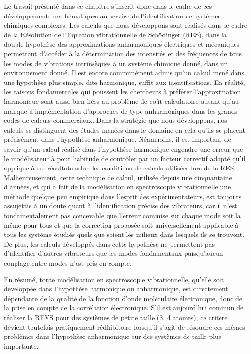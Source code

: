 Le travail présenté dans ce chapitre s'inscrit donc dans le cadre de ces développements mathématiques au service de l'identification de systèmes chimiques complexes. Les calculs que nous développons sont réalisés dans le cadre de la Résolution de l'Equation vibrationnelle de Sch\"{o}dinger (RES), dans la double hypothèse des approximations anharmoniques électriques et mécaniques permettant d'accéder à la détermination des intensités et des fréquences de tous les modes de vibrations intrinsèques à un système chimique donné, dans un environnement donné. Il est encore communément admis qu'un calcul mené dans une hypothèse plus simple, dite harmonique, suffit aux identifications. En réalité, les raisons fondamentales qui poussent les chercheurs à préférer l'approximation harmonique sont aussi bien liées au problème de coût calculatoire autant qu'au manque d'implémentation d'approches de type anharmoniques dans les grands codes de calculs commerciaux. Dans la stratégie que nous développons, nos calculs se distinguent des études menées dans le domaine en cela qu'ils se placent précisément dans l'hypothèse anharmonique. Néanmoins, il est important de savoir qu'un calcul réalisé dans l'hypothèse harmonique engendre une erreur que le modélisateur à pour habitude de \og contrôler \fg{} par un facteur correctif adapté qu'il applique à ses résultats selon les conditions de calculs utilisées lors de la RES. Malheureusement, cette technique de calcul, utilisée depuis une cinquantaine d'années, et qui a fait de la modélisation en spectroscopie vibrationnelle une méthode quelque peu empirique dans l'esprit des expérimentateurs, est toujours assujettie à un doute quant à l'identification précise des vibrateurs, car il n'est fondamentalement pas concevable que l'erreur commise sur chaque mode soit la même pour tous et que la correction proposée soit universellement applicable à tous les système étudiés quels que soient les milieux dans lesquels ils se trouvent. De plus, les calculs développés dans cette hypothèse ne permettent pas d'identifier d'autres vibrateurs que les modes fondamentaux puisqu'aucun couplage entre modes n'est pris en compte.

En résumé, toute modélisation en spectroscopie vibrationnelle, qu’elle soit développée dans l’hypothèse harmonique ou anharmonique, est directement dépendante de la qualité de la fonction d’onde moléculaire électronique, donc de la prise en compte de la corrélation électronique. S’il est aujourd’hui commun de réaliser la REVS pour des systèmes de petite taille (3, 4 atomes), ce critère devient toutefois pratiquement rédhibitoire lorsqu'il s'agit de résoudre ces mêmes problèmes dans l’hypothèse anharmonique sur des systèmes de taille plus importante.

